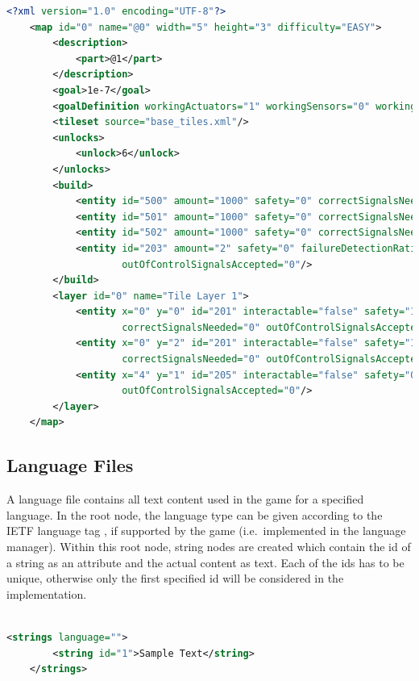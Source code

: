 \begin{lstlisting}[language=XML,label={lst:level-xml}]
    <?xml version="1.0" encoding="UTF-8"?>
    <map id="0" name="@0" width="5" height="3" difficulty="EASY">
        <description>
            <part>@1</part>
        </description>
        <goal>1e-7</goal>
        <goalDefinition workingActuators="1" workingSensors="0" workingComputers="0"/>
        <tileset source="base_tiles.xml"/>
        <unlocks>
            <unlock>6</unlock>
        </unlocks>
        <build>
            <entity id="500" amount="1000" safety="0" correctSignalsNeeded="1" outOfControlSignalsAccepted="0"/>
            <entity id="501" amount="1000" safety="0" correctSignalsNeeded="1" outOfControlSignalsAccepted="0"/>
            <entity id="502" amount="1000" safety="0" correctSignalsNeeded="1" outOfControlSignalsAccepted="0"/>
            <entity id="203" amount="2" safety="0" failureDetectionRatio="1" correctSignalsNeeded="1"
                    outOfControlSignalsAccepted="0"/>
        </build>
        <layer id="0" name="Tile Layer 1">
            <entity x="0" y="0" id="201" interactable="false" safety="1e-4" failureDetectionRatio="1"
                    correctSignalsNeeded="0" outOfControlSignalsAccepted="0"/>
            <entity x="0" y="2" id="201" interactable="false" safety="1e-4" failureDetectionRatio="1"
                    correctSignalsNeeded="0" outOfControlSignalsAccepted="0"/>
            <entity x="4" y="1" id="205" interactable="false" safety="0" failureDetectionRatio="1" correctSignalsNeeded="2"
                    outOfControlSignalsAccepted="0"/>
        </layer>
    </map>
\end{lstlisting}
\subsection{Language Files}\label{subsec:language-files}
A language file contains all text content used in the game for a specified language.
In the root node, the language type can be given according to the IETF language tag , if supported by the game (i.e.\ implemented in the language manager).
Within this root node, string nodes are created which contain the id of a string as an attribute and the actual content as text.
Each of the ids has to be unique, otherwise only the first specified id will be considered in the implementation.
\\
\\
\begin{lstlisting}[language=XML,label={lst:lang-xml}]
    <strings language="">
        <string id="1">Sample Text</string>
    </strings>
\end{lstlisting}

